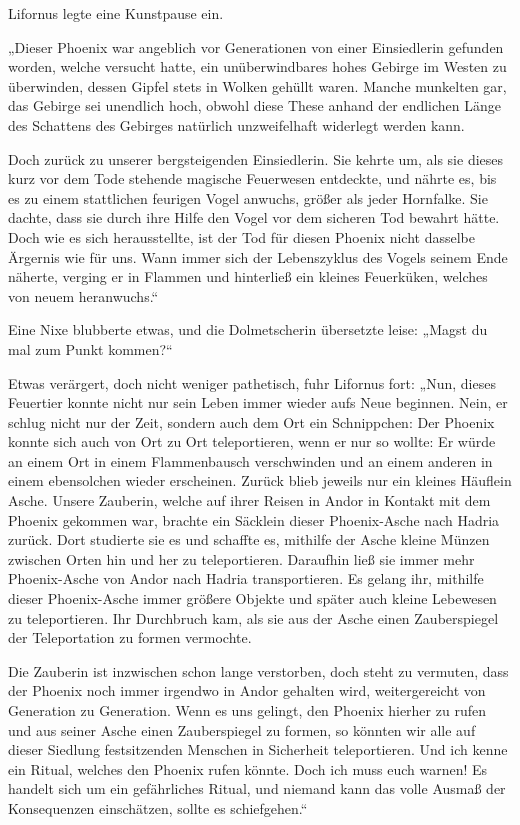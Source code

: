 Lifornus legte eine Kunstpause ein.

„Dieser Phoenix war angeblich vor Generationen von einer Einsiedlerin gefunden worden, welche versucht hatte, ein unüberwindbares hohes Gebirge im Westen zu überwinden, dessen Gipfel stets in Wolken gehüllt waren. Manche munkelten gar, das Gebirge sei unendlich hoch, obwohl diese These anhand der endlichen Länge des Schattens des Gebirges natürlich unzweifelhaft widerlegt werden kann.

Doch zurück zu unserer bergsteigenden Einsiedlerin. Sie kehrte um, als sie dieses kurz vor dem Tode stehende magische Feuerwesen entdeckte, und nährte es, bis es zu einem stattlichen feurigen Vogel anwuchs, größer als jeder Hornfalke. Sie dachte, dass sie durch ihre Hilfe den Vogel vor dem sicheren Tod bewahrt hätte. Doch wie es sich herausstellte, ist der Tod für diesen Phoenix nicht dasselbe Ärgernis wie für uns. Wann immer sich der Lebenszyklus des Vogels seinem Ende näherte, verging er in Flammen und hinterließ ein kleines Feuerküken, welches von neuem heranwuchs.“

Eine Nixe blubberte etwas, und die Dolmetscherin übersetzte leise: „Magst du mal zum Punkt kommen?“

Etwas verärgert, doch nicht weniger pathetisch, fuhr Lifornus fort: „Nun, dieses Feuertier konnte nicht nur sein Leben immer wieder aufs Neue beginnen. Nein, er schlug nicht nur der Zeit, sondern auch dem Ort ein Schnippchen: Der Phoenix konnte sich auch von Ort zu Ort teleportieren, wenn er nur so wollte: Er würde an einem Ort in einem Flammenbausch verschwinden und an einem anderen in einem ebensolchen wieder erscheinen. Zurück blieb jeweils nur ein kleines Häuflein Asche. Unsere Zauberin, welche auf ihrer Reisen in Andor in Kontakt mit dem Phoenix gekommen war, brachte ein Säcklein dieser Phoenix-Asche nach Hadria zurück. Dort studierte sie es und schaffte es, mithilfe der Asche kleine Münzen zwischen Orten hin und her zu teleportieren. Daraufhin ließ sie immer mehr Phoenix-Asche von Andor nach Hadria transportieren. Es gelang ihr, mithilfe dieser Phoenix-Asche immer größere Objekte und später auch kleine Lebewesen zu teleportieren. Ihr Durchbruch kam, als sie aus der Asche einen Zauberspiegel der Teleportation zu formen vermochte.

Die Zauberin ist inzwischen schon lange verstorben, doch steht zu vermuten, dass der Phoenix noch immer irgendwo in Andor gehalten wird, weitergereicht von Generation zu Generation. Wenn es uns gelingt, den Phoenix hierher zu rufen und aus seiner Asche einen Zauberspiegel zu formen, so könnten wir alle auf dieser Siedlung festsitzenden Menschen in Sicherheit teleportieren. Und ich kenne ein Ritual, welches den Phoenix rufen könnte. Doch ich muss euch warnen! Es handelt sich um ein gefährliches Ritual, und niemand kann das volle Ausmaß der Konsequenzen einschätzen, sollte es schiefgehen.“

